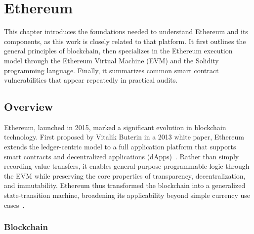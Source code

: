 
\chapter{Ethereum}
\label{ch:ethereum}

This chapter introduces the foundations needed to understand Ethereum and its components, as this work is closely related to that platform. It first outlines the general principles of blockchain, then specializes in the Ethereum execution model through the Ethereum Virtual Machine (EVM) and the Solidity programming language. Finally, it summarizes common smart contract vulnerabilities that appear repeatedly in practical audits.

\section{Overview}
\label{sec:overview}

Ethereum, launched in 2015, marked a significant evolution in blockchain technology. First proposed by Vitalik Buterin in a 2013 white paper, Ethereum extends the ledger-centric model to a full application platform that supports smart contracts and decentralized applications (dApps)~\cite{Buterin2013}. Rather than simply recording value transfers, it enables general-purpose programmable logic through the EVM while preserving the core properties of transparency, decentralization, and immutability. Ethereum thus transformed the blockchain into a generalized state-transition machine, broadening its applicability beyond simple currency use cases~\cite{wood2014yellow}.

\subsection{Blockchain}
\label{subsec:blockchain}

